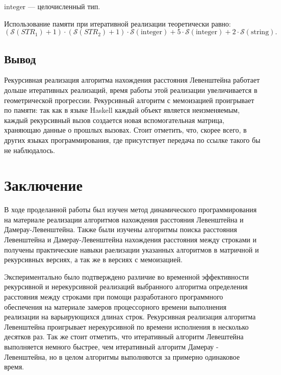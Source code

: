 \documentclass[12pt]{report}
\begin{document}
\noindent $\mathrm{integer}$ — целочисленный тип.

Использование памяти при итеративной реализации теоретически равно:
\begin{equation}
(\mathcal{S}(STR_1) + 1) \cdot (\mathcal{S}(STR_2) + 1) \cdot \mathcal{S}\mathrm{(integer)} + 5\cdot \mathcal{S}\mathrm{(integer)} + 2 \cdot \mathcal{S}\mathrm{(string)}.
\end{equation}


\section{Вывод}

Рекурсивная реализация алгоритма нахождения расстояния Левенштейна работает дольше итеративных реализаций, время работы этой реализации увеличивается в геометрической прогрессии. Рекурсивный алгоритм с мемоизацией проигрывает по памяти: так как в языке Haskell каждый объект является неизменяемым, каждый рекурсивный вызов создается новая вспомогательная матрица, храняющаю данные о прошлых вызовах. Стоит отметить, что, скорее всего, в других языках программирования, где присутствует передача по ссылке такого бы не наблюдалось. 


\chapter*{Заключение}

В ходе проделанной работы был изучен метод динамического программирования на материале реализации алгоритмов нахождения расстояния Левенштейна и Дамерау-Левенштейна. Также были изучены алгоритмы поиска расстояния Левенштейна и Дамерау-Левенштейна нахождения расстояния между строками и получены практические навыки раелизации указанных алгоритмов в матричной и рекурсивных версиях, а так же в версиях с мемоизацией.

Экспериментально было подтверждено различие во временной эффективности рекурсивной и нерекурсивной реализаций выбранного алгоритма определения расстояния между строками при помощи разработаного программного обеспечения на материале замеров процессорного времени выполнения реализации на варьирующихся длинах строк. Рекурсивная реализация алгоритма Левенштейна проигрывает нерекурсивной по времени исполнения в несколько десятков раз. Так же стоит отметить, что итеративный алгоритм Левештейна выполняется немного быстрее, чем итеративный алгоритм Дамерау - Левенштейна, но в целом алгоритмы выполняются за примерно одинаковое время.
\end{document}
